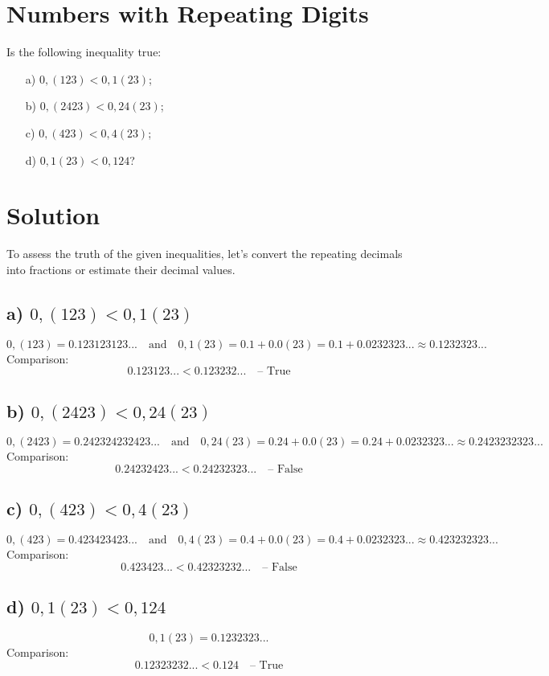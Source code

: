 \documentclass{article}
\begin{document}
\section{Numbers with Repeating Digits}

Is the following inequality true:
\begin{itemize}
\item[a)] \( 0,(123) < 0,1(23) \);
\item[b)] \( 0,(2423) < 0,24(23) \);
\item[c)] \( 0,(423) < 0,4(23) \);
\item[d)] \( 0,1(23) < 0,124 \)?
\end{itemize}

\section{Solution}

To assess the truth of the given inequalities, let's convert the repeating decimals into fractions or estimate their decimal values.

\subsection{a) \( 0,(123) < 0,1(23) \)}

\[
0,(123) = 0.123123123... \quad \text{and} \quad 0,1(23) = 0.1 + 0.0(23) = 0.1 + 0.0232323... \approx 0.1232323...
\]
Comparison:
\[
0.123123... < 0.123232... \quad \text{– True}
\]

\subsection{b) \( 0,(2423) < 0,24(23) \)}

\[
0,(2423) = 0.242324232423... \quad \text{and} \quad 0,24(23) = 0.24 + 0.0(23) = 0.24 + 0.0232323... \approx 0.2423232323...
\]
Comparison:
\[
0.24232423... < 0.24232323... \quad \text{– False}
\]

\subsection{c) \( 0,(423) < 0,4(23) \)}

\[
0,(423) = 0.423423423... \quad \text{and} \quad 0,4(23) = 0.4 + 0.0(23) = 0.4 + 0.0232323... \approx 0.423232323...
\]
Comparison:
\[
0.423423... < 0.42323232... \quad \text{– False}
\]

\subsection{d) \( 0,1(23) < 0,124 \)}

\[
0,1(23) = 0.1232323... 
\]
Comparison:
\[
0.12323232... < 0.124 \quad \text{– True}
\]
\end{document}
